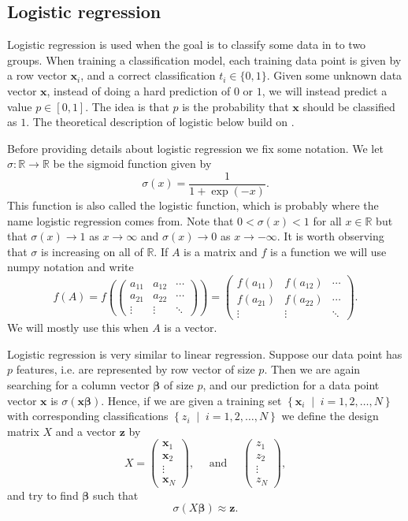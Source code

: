 \documentclass[parskip=half]{scrartcl}
\newcommand{\setof}[2]{\left\{ #1 \; \middle\vert \; #2 \right\}}
\theoremstyle{definition}
\theoremstyle{remark}
\newcommand{\vect}[1]{{\bm{#1}}}
\newcommand{\R}{\mathbb{R}}
\begin{document}
\subsection{Logistic regression} \label{sec:logistic} 

Logistic regression is used when the goal is to classify some data in to two groups. 
When training a classification model, each training data point is given by a row vector $\vect{x}_i$, and a correct classification $t_i \in \{0,1\}$.  
Given some unknown data vector $\vect{x}$, instead of doing a hard prediction of $0$ or $1$, we will instead predict a value $p \in [0,1]$. 
The idea is that $p$ is the probability that $\vect{x}$ should be classified as $1$. 
The theoretical description of logistic below build on \cite{Ng}.

Before providing details about logistic regression we fix some notation. 
We let $\sigma \colon \R \to \R$ be the sigmoid function given by 
\[
	\sigma(x) = \frac{1}{1 + \exp(-x)}.
\]
This function is also called the logistic function, which is probably where the name logistic regression comes from. 
Note that $0 < \sigma(x) < 1$ for all $x \in \R$ but that $\sigma(x) \to 1$ as $x \to \infty$ and $\sigma(x) \to 0$ as $x \to -\infty$. 
It is worth observing that $\sigma$ is increasing on all of $\R$.
If $A$ is a matrix and $f$ is a function we will use numpy notation and write 
\[
	f(A) = 
	f \left(  \begin{pmatrix} a_{11} & a_{12} & \cdots \\ a_{21} & a_{22} & \cdots \\  \vdots & \vdots & \ddots \end{pmatrix}	 \right)
	= \begin{pmatrix} f(a_{11}) & f(a_{12}) & \cdots \\ f(a_{21}) & f(a_{22}) & \cdots \\  \vdots & \vdots & \ddots \end{pmatrix}.
\]
We will mostly use this when $A$ is a vector. 

Logistic regression is very similar to linear regression. 
Suppose our data point has $p$ features, i.e. are represented by row vector of size $p$. 
Then we are again searching for a column vector $\vect{\beta}$ of size $p$, and our prediction for a data point vector $\vect{x}$ is $\sigma(\vect{x} \vect{\beta})$.
Hence, if we are given a training set $\setof{ \vect{x}_i}{i = 1,2, \ldots, N}$ with corresponding classifications $\setof{z_i}{i = 1,2,\ldots, N}$ we define the design matrix $X$ and a vector $\vect{z}$ by   
\[
	X = \begin{pmatrix}
	 \vect{x}_1 \\
	 \vect{x}_2 \\
	 \vdots \\
	 \vect{x}_N	
	 \end{pmatrix}, 
	 \quad \text{ and } \quad
	 \begin{pmatrix}
	 z_1 \\ z_2 \\ \vdots \\ z_N
	\end{pmatrix},
\]
and try to find $\vect{\beta}$ such that 
\[
	\sigma(X \vect{\beta}) \approx \vect{z}.
\]
\end{document}
